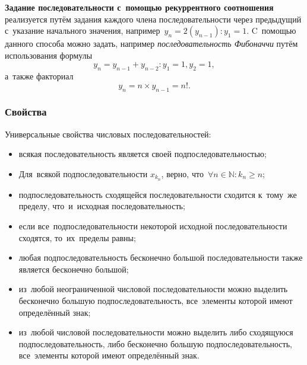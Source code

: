 \documentclass[]{scrartcl}
\begin{document}
{{\textbf{Задание последовательности с~помощью рекуррентного соотношения} реализуется путём задания каждого члена последовательности через предыдущий с~указание начального значения, например~${\textstyle y_n=2(y_{n-1}): y_1=1}$. C~помощью данного способа можно задать, например \emph{последовательность Фибоначчи} путём использования формулы
\begin{equation}\label{eq:fibonacci}
y_n=y_{n-1}+y_{n-2}: y_1=1, y_2=1,
\end{equation}
а~также факториал
\begin{equation}\label{eq:factorial}
y_n=n \times y_{n-1}=n!.
\end{equation}

\subsubsection{Свойства}
Универсальные свойства числовых последовательностей:
\begin{itemize}
	\item всякая последовательность является своей подпоследовательностью;
	\item Для~всякой подпоследовательности ${\textstyle x_{k_{n}}}$, верно, что~${\textstyle \forall n\in \mathbb {N} \colon k_{n}\geqslant n}$;
	\item подпоследовательность сходящейся последовательности сходится к~тому~же пределу, что~и~исходная последовательность;
	\item если все~подпоследовательности некоторой исходной последовательности сходятся, то~их~пределы равны;
	\item любая подпоследовательность бесконечно большой последовательности также является бесконечно большой;
	\item из~любой неограниченной числовой последовательности можно выделить бесконечно большую подпоследовательность, все~элементы которой имеют определённый знак;
	\item из~любой числовой последовательности можно выделить либо сходящуюся подпоследовательность, либо бесконечно большую подпоследовательность, все~элементы которой имеют определённый знак.
\end{itemize}

}}
\end{document}
